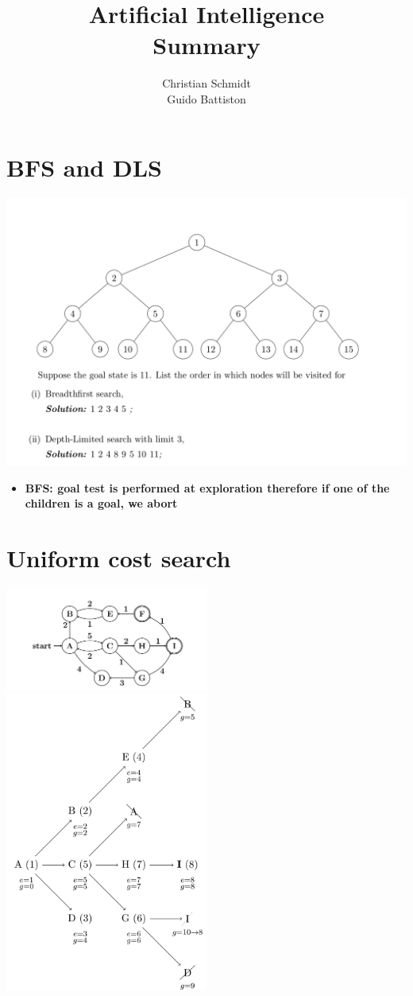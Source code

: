 \documentclass[conference]{styles/acmsiggraph}
\title{\huge Artificial Intelligence \\ \LARGE {Summary}}
\author{\Large Christian Schmidt \\ \Large Guido Battiston}
\begin{document}
\maketitle

\tableofcontents
\newpage

\section{BFS and DLS}

\includegraphics[width=\textwidth]{bfs.png}

\begin{itemize}
    \item \textbf{BFS: goal test is performed at exploration therefore if one of the children is a goal, we abort}
\end{itemize}

\section{Uniform cost search}
\includegraphics[width=0.5\textwidth]{graph1.png}
\includegraphics[width=0.5\textwidth]{uniform.png}
\end{document}

